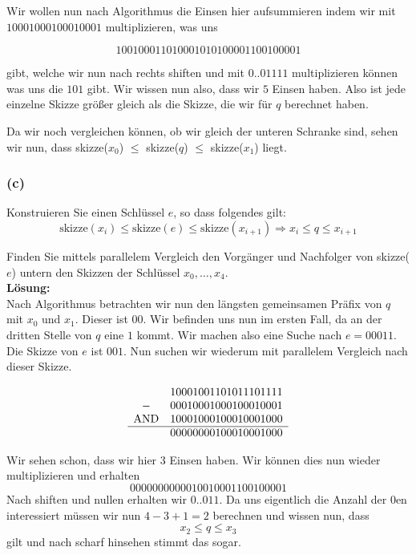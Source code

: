 \documentclass[11pt,a4paper,ngerman]{article}
\begin{document}
Wir wollen nun nach Algorithmus die Einsen hier aufsummieren indem wir mit
$10001000100010001$ multiplizieren, was uns

$$1 0010 0011 0100 0101 0100 0011 0010 0001$$

gibt, welche wir nun nach rechts shiften und mit $0..01111$ multiplizieren können
was uns die $101$ gibt. Wir wissen nun also, dass wir $5$ Einsen haben. Also
ist jede einzelne Skizze größer gleich als die Skizze, die wir für $q$ berechnet haben.


Da wir noch vergleichen können, ob wir gleich der unteren Schranke sind, sehen wir
nun, dass skizze($x_0$) $\leq$ skizze($q$) $\leq$ skizze($x_1$) liegt.

\subsubsection*{(c)}

Konstruieren Sie einen Schlüssel $e$, so dass folgendes gilt:
$$
   \text{skizze}(x_i) \leq \text{skizze}(e) \leq \text{skizze}(x_{i+1}) 
      \Rightarrow x_i \leq q \leq x_{i+1}
$$

Finden Sie mittels parallelem Vergleich den Vorgänger und Nachfolger von skizze($e$) untern den Skizzen der Schlüssel $x_0, \ldots, x_4$.\\

\noindent\textbf{Lösung:}\\

Nach Algorithmus betrachten wir nun den längsten gemeinsamen Präfix von $q$ mit $x_0$ und $x_1$. Dieser ist $00$. Wir befinden uns nun im ersten Fall, da an der dritten Stelle von $q$ eine $1$ kommt. Wir machen also eine Suche nach $e = 00011$.\\

Die Skizze von $e$ ist $001$. Nun suchen wir wiederum mit parallelem Vergleich nach
dieser Skizze.

$$
\begin{array}{cl}
     & 1 000 1 001 1 010 1 110 1 111\\
   - & 0 001 0 001 0 001 0 001 0 001\\
   \text{AND} & 1 000 1 000 1 000 1 000 1 000\\
   \hline
   & 0 000 0 000 1 000 1 000 1 000
\end{array}
$$

Wir sehen schon, dass wir hier $3$ Einsen haben. Wir können dies nun wieder multiplizieren und erhalten
$$
 0000 0000 0001 0010 0011 0010 0001
$$
Nach shiften und nullen erhalten wir $0..011$. Da uns eigentlich die Anzahl der
$0$en interessiert müssen wir nun $4-3+1 = 2$ berechnen und wissen nun, dass
$$
   x_2 \leq q \leq x_3
$$
gilt und nach scharf hinsehen stimmt das sogar.
\label{LastPage}
\end{document}

